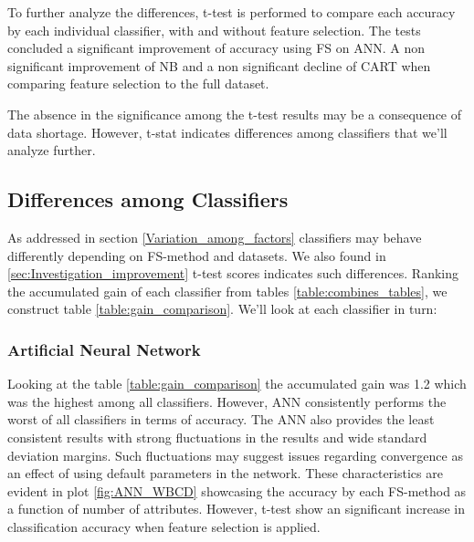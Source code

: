 To further analyze the differences, t-test is performed to compare each accuracy by each individual classifier, with and without feature selection. The tests concluded a significant improvement of accuracy using FS on ANN. A non significant improvement of NB and a non significant decline of CART when comparing feature selection to the full dataset.



The absence in the significance among the t-test results may be a consequence of data shortage. However, t-stat indicates differences among classifiers that we'll analyze further.


\subsection{Differences among Classifiers}

As addressed in section \ref{Variation_among_factors} classifiers may behave differently depending on FS-method and datasets. We also found in \ref{sec:Investigation_improvement} t-test scores indicates such differences. Ranking the accumulated gain of each classifier from tables \ref{table:combines_tables}, we construct table \ref{table:gain_comparison}. We'll look at each classifier in turn:

\begin{table}[hp]
  
  \caption[]%
  {{\small Ranking of which classifiers gained most accuracy when comparing feature selection to full dataset.}}
  \label{table:gain_comparison}
\end{table}

\subsubsection{Artificial Neural Network}

Looking at the table \ref{table:gain_comparison} the accumulated gain was 1.2 which was the highest among all classifiers. However, ANN consistently performs the worst of all classifiers in terms of accuracy. The ANN also provides the least consistent results with strong fluctuations in the results and wide standard deviation margins. Such fluctuations may suggest issues regarding convergence as an effect of using default parameters in the network. These characteristics are evident in plot \ref{fig:ANN_WBCD} showcasing the accuracy by each FS-method as a function of number of attributes. However, t-test show an significant increase in classification accuracy when feature selection is applied.


